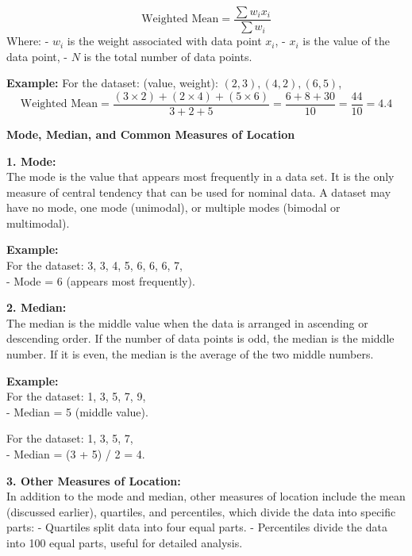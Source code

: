 \documentclass[12pt,a4paper]{book}
\begin{document}
\[
\text{Weighted Mean} = \frac{\sum w_i x_i}{\sum w_i}
\]
Where:
- \(w_i\) is the weight associated with data point \(x_i\),
- \(x_i\) is the value of the data point,
- \(N\) is the total number of data points.

\textbf{Example:}
For the dataset: (value, weight): \((2, 3), (4, 2), (6, 5)\),
\[
\text{Weighted Mean} = \frac{(3 \times 2) + (2 \times 4) + (5 \times 6)}{3 + 2 + 5} = \frac{6 + 8 + 30}{10} = \frac{44}{10} = 4.4
\]

\vspace{1cm}


\textbf{Mode, Median, and Common Measures of Location}

\vspace{0.5cm}

\textbf{1. Mode:} \\
The mode is the value that appears most frequently in a data set. It is the only measure of central tendency that can be used for nominal data. A dataset may have no mode, one mode (unimodal), or multiple modes (bimodal or multimodal).

\textbf{Example:} \\
For the dataset: 3, 3, 4, 5, 6, 6, 6, 7, \\
- Mode = 6 (appears most frequently).

\vspace{0.5cm}

\textbf{2. Median:} \\
The median is the middle value when the data is arranged in ascending or descending order. If the number of data points is odd, the median is the middle number. If it is even, the median is the average of the two middle numbers.

\textbf{Example:} \\
For the dataset: 1, 3, 5, 7, 9, \\
- Median = 5 (middle value).

For the dataset: 1, 3, 5, 7, \\
- Median = (3 + 5) / 2 = 4.

\vspace{0.5cm}

\textbf{3. Other Measures of Location:} \\
In addition to the mode and median, other measures of location include the mean (discussed earlier), quartiles, and percentiles, which divide the data into specific parts:
- Quartiles split data into four equal parts.
- Percentiles divide the data into 100 equal parts, useful for detailed analysis.
\end{document}
